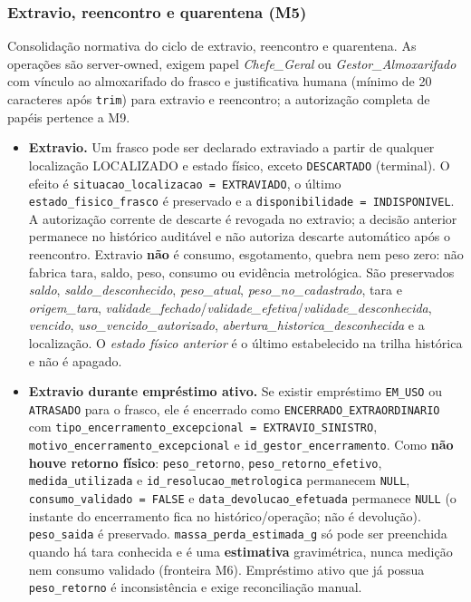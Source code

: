 \subsubsection{Extravio, reencontro e quarentena (M5)}
\begin{regra}
Consolidação normativa do ciclo de extravio, reencontro e quarentena. As operações são server-owned, exigem papel \textit{Chefe\_Geral} ou \textit{Gestor\_Almoxarifado} com vínculo ao almoxarifado do frasco e justificativa humana (mínimo de 20 caracteres após \texttt{trim}) para extravio e reencontro; a autorização completa de papéis pertence a M9.
\begin{itemize}
    \item \textbf{Extravio.} Um frasco pode ser declarado extraviado a partir de qualquer localização LOCALIZADO e estado físico, exceto \texttt{DESCARTADO} (terminal). O efeito é \texttt{situacao\_localizacao = EXTRAVIADO}, o último \texttt{estado\_fisico\_frasco} é preservado e a \texttt{disponibilidade = INDISPONIVEL}. A autorização corrente de descarte é revogada no extravio; a decisão anterior permanece no histórico auditável e não autoriza descarte automático após o reencontro. Extravio \textbf{não} é consumo, esgotamento, quebra nem peso zero: não fabrica tara, saldo, peso, consumo ou evidência metrológica. São preservados \textit{saldo}, \textit{saldo\_desconhecido}, \textit{peso\_atual}, \textit{peso\_no\_cadastrado}, tara e \textit{origem\_tara}, \textit{validade\_fechado}/\textit{validade\_efetiva}/\textit{validade\_desconhecida}, \textit{vencido}, \textit{uso\_vencido\_autorizado}, \textit{abertura\_historica\_desconhecida} e a localização. O \textit{estado físico anterior} é o último estabelecido na trilha histórica e não é apagado.
    \item \textbf{Extravio durante empréstimo ativo.} Se existir empréstimo \texttt{EM\_USO} ou \texttt{ATRASADO} para o frasco, ele é encerrado como \texttt{ENCERRADO\_EXTRAORDINARIO} com \texttt{tipo\_encerramento\_excepcional = EXTRAVIO\_SINISTRO}, \texttt{motivo\_encerramento\_excepcional} e \texttt{id\_gestor\_encerramento}. Como \textbf{não houve retorno físico}: \texttt{peso\_retorno}, \texttt{peso\_retorno\_efetivo}, \texttt{medida\_utilizada} e \texttt{id\_resolucao\_metrologica} permanecem \texttt{NULL}, \texttt{consumo\_validado = FALSE} e \texttt{data\_devolucao\_efetuada} permanece \texttt{NULL} (o instante do encerramento fica no histórico/operação; não é devolução). \texttt{peso\_saida} é preservado. \texttt{massa\_perda\_estimada\_g} só pode ser preenchida quando há tara conhecida e é uma \textbf{estimativa} gravimétrica, nunca medição nem consumo validado (fronteira M6). Empréstimo ativo que já possua \texttt{peso\_retorno} é inconsistência e exige reconciliação manual.

\end{itemize}
\end{regra}
